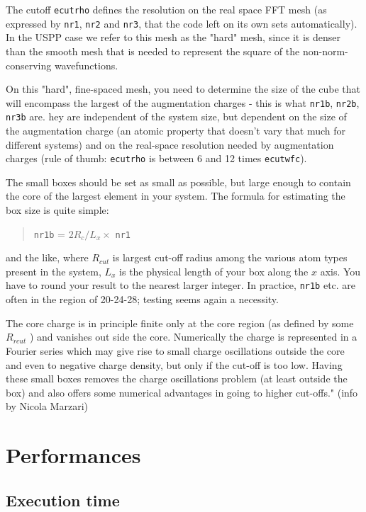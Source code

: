 \documentclass[12pt,a4paper]{article}
\begin{document}
The cutoff \texttt{ecutrho} defines the resolution on the real space FFT mesh (as expressed 
by \texttt{nr1}, \texttt{nr2} and \texttt{nr3}, that the code left on its own sets automatically).
In the USPP case we refer to this mesh as the "hard" mesh, since it 
is denser than the smooth mesh that is needed to represent the square 
of the non-norm-conserving wavefunctions.
  
On this "hard", fine-spaced mesh, you need to determine the size of the
cube that will encompass the largest of the augmentation charges - this
is what \texttt{nr1b}, \texttt{nr2b}, \texttt{nr3b} are. hey are independent 
of the system size, but dependent on the size
of the augmentation charge (an atomic property that doesn't vary 
that much for different systems) and on the
real-space resolution needed by augmentation charges (rule of thumb:
\texttt{ecutrho} is between 6 and 12 times \texttt{ecutwfc}).

The small boxes should be set as small as possible, but large enough
to contain the core of the largest element in your system.
The formula for estimating the box size is quite simple: 
\begin{quote}
   \texttt{nr1b} = $2 R_c / L_x \times$ \texttt{nr1}
\end{quote}
and the like, where $R_{cut}$ is largest cut-off radius among the various atom
types present in the system, $L_x$ is the
physical length of your box along the $x$ axis. You have to round your
result to the nearest larger integer.
In practice, \texttt{nr1b} etc. are often in the region of 20-24-28; testing seems
again a necessity.

The core charge is in principle finite only at the core region (as defined
by some $R_{rcut}$ ) and vanishes out side the core. Numerically the charge is
represented in a Fourier series which may give rise to small charge
oscillations outside the core and even to negative charge density, but
only if the cut-off is too low. Having these small boxes removes the
charge oscillations problem (at least outside the box) and also offers
some numerical advantages in going to higher cut-offs." (info by Nicola Marzari)

\section{Performances}

\subsection{Execution time}
\end{document}
